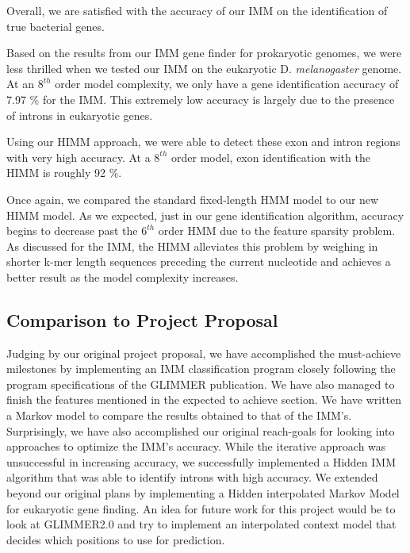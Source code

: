 \documentclass[11pt,letterpaper]{article}
\begin{document}
Overall, we are satisfied with the accuracy of our IMM on the identification of true bacterial genes.

Based on the results from our IMM gene finder for prokaryotic genomes, we were less thrilled when we tested our IMM on the eukaryotic D. \emph{melanogaster} genome. At an $8^{th}$ order model complexity, we only have a gene identification accuracy of 7.97 \% for the IMM. This extremely low accuracy is largely due to the presence of introns in eukaryotic genes.

Using our HIMM approach, we were able to detect these exon and intron regions with very high accuracy. At a $8^{th}$ order model, exon identification with the HIMM is roughly 92 \%. 

Once again, we compared the standard fixed-length HMM model to our new HIMM model. As we expected, just in our gene identification algorithm, accuracy begins to decrease past the $6^{th}$ order HMM due to the feature sparsity problem. As discussed for the IMM, the HIMM alleviates this problem by weighing in shorter k-mer length sequences preceding the current nucleotide and achieves a better result as the model complexity increases.

\subsection{Comparison to Project Proposal}
Judging by our original project proposal, we have accomplished the must-achieve milestones by implementing an IMM classification program closely following the program specifications of the GLIMMER publication. We have also managed to finish the features mentioned in the expected to achieve section. We have written a Markov model to compare the results obtained to that of the IMM’s. Surprisingly, we have also accomplished our original reach-goals for looking into  approaches to optimize the IMM’s accuracy. While the iterative approach was unsuccessful in increasing accuracy, we successfully implemented a Hidden IMM algorithm that was able to identify introns with high accuracy. We extended beyond our original plans by implementing a Hidden interpolated Markov Model for eukaryotic gene finding.
An idea for future work for this project would be to look at GLIMMER2.0 and try to implement an interpolated context model that decides which positions to use for prediction.
\end{document}
